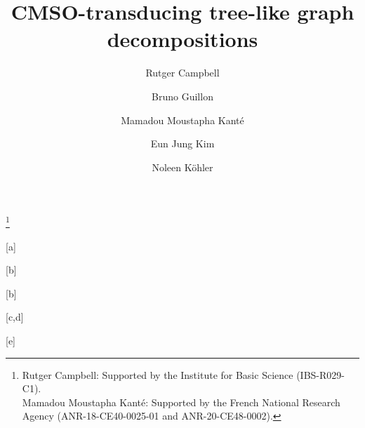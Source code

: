 \documentclass{lmcs} %
\begin{document}
\title[CMSO-transducing tree-like graph decompositions]{CMSO-transducing tree-like graph decompositions\rsuper*}
\thanks{Rutger Campbell: Supported by the Institute for Basic Science (IBS-R029-C1).\\
Mamadou Moustapha Kant\'{e}: Supported by the French National Research Agency (ANR-18-CE40-0025-01 and ANR-20-CE48-0002).}	%

\author[R.~Campbell]{Rutger Campbell}[a]
\author[B.~Guillon]{Bruno Guillon}[b]
\author[M.~M.~Kant\'{e}]{Mamadou Moustapha Kant\'{e}}[b]
\author[E.~J.~Kim]{Eun Jung Kim}[c,d]
\author[N.~K\"{o}hler]{Noleen K\"{o}hler}[e]

\address{Discrete Mathematics Group, Institute for Basic Science, Daejeon, Korea}	

\address{Université Clermont Auvergne, Clermont Auvergne INP, LIMOS, CNRS, Clermont-Ferrand, France}	

\address{KAIST, Daejeon, South Korea}	

\address{CNRS, France}	  

\address{University of Leeds, Leeds, UK}	




\end{document}

